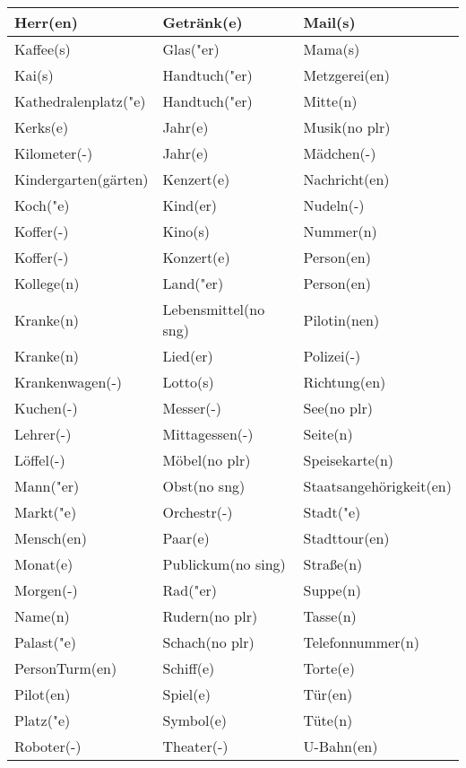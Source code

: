\documentclass{article}
\begin{document}
\begin{table}[h!]
\begin{tabular}{|>{\raggedright\arraybackslash}p{5cm}|>{\raggedright\arraybackslash}p{5cm}|>{\raggedright\arraybackslash}p{5cm}|}
        Herr(en) & Getränk(e) & Mail(s) \\\hline
        Kaffee(s) & Glas("er) & Mama(s) \\\hline
        Kai(s) & Handtuch("er) & Metzgerei(en) \\\hline
        Kathedralenplatz("e) & Handtuch("er) & Mitte(n) \\\hline
        Kerks(e) & Jahr(e) & Musik(no plr) \\\hline
        Kilometer(-) & Jahr(e) & Mädchen(-) \\\hline
        Kindergarten(gärten) & Kenzert(e) & Nachricht(en) \\\hline
        Koch("e) & Kind(er) & Nudeln(-) \\\hline
        Koffer(-) & Kino(s) & Nummer(n) \\\hline
        Koffer(-) & Konzert(e) & Person(en) \\\hline
        Kollege(n) & Land("er) & Person(en) \\\hline
        Kranke(n) & Lebensmittel(no sng) & Pilotin(nen) \\\hline
        Kranke(n) & Lied(er) & Polizei(-) \\\hline
        Krankenwagen(-) & Lotto(s) & Richtung(en) \\\hline
        Kuchen(-) & Messer(-) & See(no plr) \\\hline
        Lehrer(-) & Mittagessen(-) & Seite(n) \\\hline
        Löffel(-) & Möbel(no plr) & Speisekarte(n) \\\hline
        Mann("er) & Obst(no sng) & Staatsangehörigkeit(en) \\\hline
        Markt("e) & Orchestr(-) & Stadt("e) \\\hline
        Mensch(en) & Paar(e) & Stadttour(en) \\\hline
        Monat(e) & Publickum(no sing) & Stra\ss{}e(n) \\\hline
        Morgen(-) & Rad("er) & Suppe(n) \\\hline
        Name(n) & Rudern(no plr) & Tasse(n) \\\hline
        Palast("e) & Schach(no plr) & Telefonnummer(n) \\\hline
        PersonTurm(en) & Schiff(e) & Torte(e) \\\hline
        Pilot(en) & Spiel(e) & Tür(en) \\\hline
        Platz("e) & Symbol(e) & Tüte(n) \\\hline
        Roboter(-) & Theater(-) & U-Bahn(en) \\\hline

\end{tabular}
\end{table}
\end{document}
